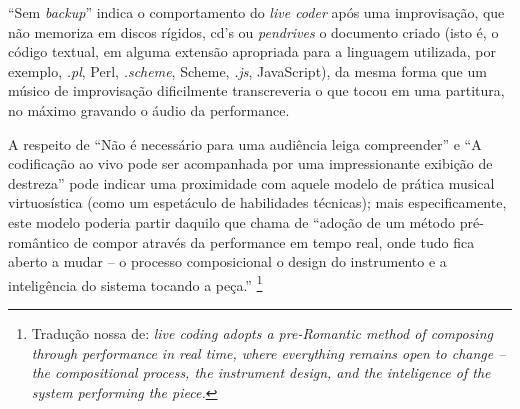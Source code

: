 ``Sem \emph{backup}'' indica o comportamento do \emph{live coder} após uma improvisação, que não memoriza em discos rígidos, cd's ou \emph{pendrives} o documento criado (isto é, o código textual, em alguma extensão apropriada para a linguagem utilizada, por exemplo, \emph{.pl}, Perl, \emph{.scheme}, Scheme, \emph{.js}, JavaScript), da mesma forma que um músico de improvisação dificilmente transcreveria o que tocou em uma partitura, no máximo gravando o áudio da performance.

A respeito de ``Não é necessário para uma audiência leiga compreender'' e ``A codificação ao vivo pode ser acompanhada por uma impressionante exibição de destreza'' pode indicar uma proximidade com aquele modelo de prática musical virtuosística (como um espetáculo de habilidades técnicas); mais especificamente, este modelo poderia partir daquilo que   chama de ``adoção de um método pré-romântico de compor através da performance em tempo real, onde tudo fica aberto a mudar -- o processo composicional o design do instrumento e a inteligência do sistema tocando a peça.'' \cite[p.~4]{magnusson_herding_2014}\footnote{Tradução nossa de: \emph{live coding adopts a pre-Romantic method of composing through performance in real time, where everything remains open to change -- the compositional process, the instrument design, and the inteligence of the system performing the piece.}}

